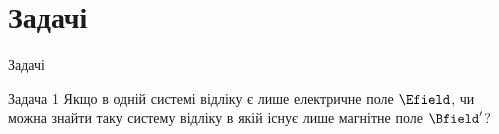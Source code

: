 \documentclass[]{beamer}
\begin{document}
\section{Задачі}



\begin{frame}{Задачі}{}
	\begin{exampleblock}{Задача 1}
		Якщо в одній системі відліку є лише електричне поле $ \Efield $, чи можна знайти таку систему відліку в якій існує лише магнітне поле $ \Bfield'
		$?
	\end{exampleblock}
\end{frame}
\end{document}
